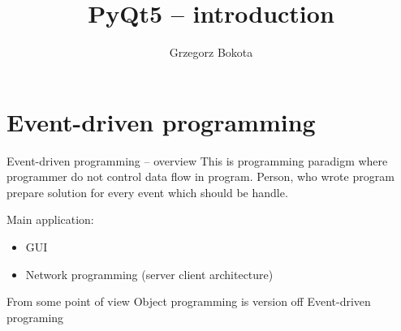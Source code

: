 \documentclass[11pt,usenames,dvipsnames]{beamer}
\author{Grzegorz Bokota}
\title{PyQt5 – introduction}
\begin{document}
\begin{frame}[plain]
  \maketitle
\end{frame}
\section{Event-driven programming}
\begin{frame}{Event-driven programming – overview}
  This is programming paradigm where programmer do not control data flow 
  in program. Person, who wrote program prepare solution for every 
  event which should be handle.

  Main application: 
  \begin{itemize}
    \item GUI
    \item Network programming (server client architecture) 
  \end{itemize}
  From some point of view Object programming is version off Event-driven programing 
\end{frame}
\end{document}
